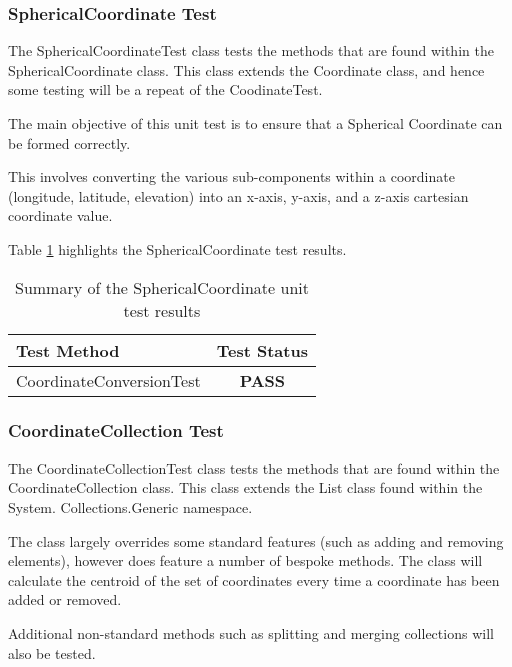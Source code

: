 \subsubsection{SphericalCoordinate Test}

The {\ttfamily SphericalCoordinateTest} class tests the methods that are 
found within the SphericalCoordinate class. This class extends the Coordinate 
class, and hence some testing will be a repeat of the {\ttfamily CoodinateTest}.

The main objective of this unit test is to ensure that a Spherical Coordinate 
can be formed correctly. 

This involves converting the various sub-components within a coordinate 
(longitude, latitude, elevation) into an x-axis, y-axis, and a z-axis cartesian
coordinate value.

Table \ref{tab:spherical_coordinate_test} highlights the SphericalCoordinate 
test results.

\begin{table}[h]
  \centering
  \begin{tabular}{|l|c|}
    \hline
    {\bfseries Test Method}  & {\bfseries Test Status} \\ 
    \hline
    CoordinateConversionTest & {\bfseries \color{OliveGreen} PASS} \\
    \hline
  \end{tabular}
  \caption[Summary of the SphericalCoordinate unit test results]
          {Summary of the SphericalCoordinate unit test results}
  \label{tab:spherical_coordinate_test}
\end{table}


\subsubsection{CoordinateCollection Test}

The {\ttfamily CoordinateCollectionTest} class tests the methods that are 
found within the CoordinateCollection class. This class extends the List 
class found within the {\ttfamily System. Collections.Generic} namespace.

The class largely overrides some standard features (such as adding and removing 
elements), however does feature a number of bespoke methods. The class will 
calculate the centroid of the set of coordinates every time a coordinate has 
been added or removed.

Additional non-standard methods such as splitting and merging collections will 
also be tested.

